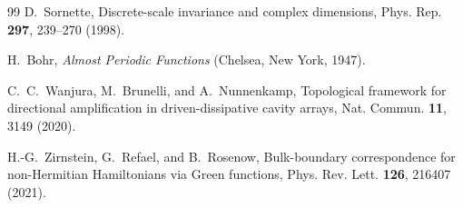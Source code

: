 \documentclass[11pt,a4paper]{article}
\begin{document}
\begin{thebibliography}{99}
 D.~Sornette, Discrete-scale invariance and
complex dimensions, Phys. Rep. \textbf{297}, 239--270 (1998).

 H.~Bohr, \emph{Almost Periodic Functions}
(Chelsea, New York, 1947).

 C.~C.~Wanjura, M.~Brunelli, and A.~Nunnenkamp,
Topological framework for directional amplification in driven-dissipative
cavity arrays, Nat. Commun. \textbf{11}, 3149 (2020).

 H.-G.~Zirnstein, G.~Refael, and B.~Rosenow,
Bulk-boundary correspondence for non-Hermitian Hamiltonians via Green
functions, Phys. Rev. Lett. \textbf{126}, 216407 (2021).

\end{thebibliography}
\end{document}
